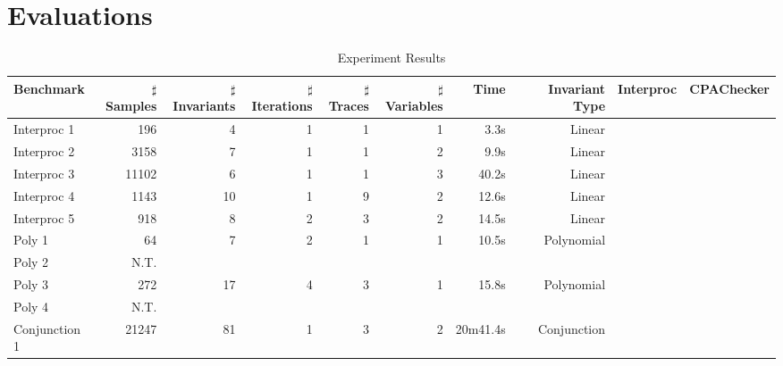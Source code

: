 
\section{Evaluations} %
\label{sec:evaluations}


\begin{table*}[t]
    \begin{center}
    \begin{center}
    \begin{adjustbox}{max width=1\textwidth}
    \begin{tabular}{l | r | r | r | r | r | r | r | r | r}
        \hline\hline
        Benchmark 
            & $\sharp$Samples & $\sharp$Invariants & $\sharp$Iterations 
            & $\sharp$Traces & $\sharp$Variables
            & Time & Invariant Type 
            & Interproc & CPAChecker 
            \\
        \hline
        Interproc 1
            & 196 & 4 & 1 
            & 1 & 1
            & 3.3s & Linear 
            \\
        \hline
        Interproc 2
            & 3158 & 7 & 1 
            & 1 & 2
            & 9.9s & Linear 
            \\
        \hline
        Interproc 3
            & 11102 & 6 & 1
            & 1 & 3
            & 40.2s & Linear 
            \\
        \hline
        Interproc 4
            & 1143 & 10 & 1
            & 9 & 2
            & 12.6s & Linear 
            \\
        \hline
        Interproc 5
            & 918 & 8 & 2 
            & 3 & 2
            & 14.5s & Linear 
            \\
        \hline
        Poly 1
            & 64 & 7 & 2
            & 1 & 1 
            & 10.5s & Polynomial 
            \\
        \hline
        Poly 2 
            & N.T. 
            \\
        \hline
        Poly 3 
            & 272 & 17 & 4 
            & 3 & 1 
            & 15.8s & Polynomial 
            \\
        \hline
        Poly 4 
            & N.T. 
            \\
        \hline
        Conjunction 1
            & 21247 & 81 & 1 
            & 3 & 2 
            & 20m41.4s & Conjunction
            & 
            \\
        \hline
    \end{tabular}
    \end{adjustbox}
    \end{center}
    \end{center}
    \caption{Experiment Results}
    \label{tab:experiments}
\end{table*}


